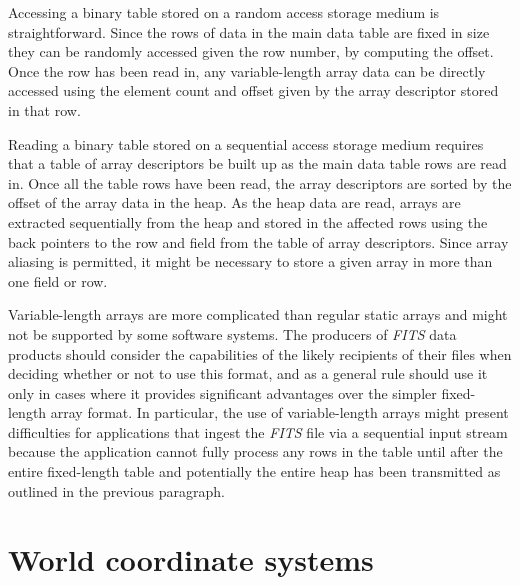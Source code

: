 \documentclass[onecolumn]{aa}
\begin{document}
Accessing a binary table stored on a random access storage medium is
straightforward.  Since the rows of data in the main data table are fixed
in size they can be randomly accessed given the row number, by
computing the offset.  Once the row has been read in, any variable-length
array data can be directly accessed using the element count and
offset given by the array descriptor stored in that row.

Reading a binary table stored on a sequential access storage medium
requires that a table of array descriptors be built
up as the main data
table rows are read in.  Once all the table rows have been read,
the array descriptors are sorted by the offset of the array data in
the heap.  As the heap data are read, 
arrays are extracted sequentially
from the heap and stored in the affected rows using the back
pointers to the row and field from the table of array descriptors.
Since array aliasing is permitted, it might be necessary to store a
given array in more than one field or row.

Variable-length arrays are more complicated
than regular static arrays and
might not be supported by some software systems.  The producers of
{\em FITS\/} data products should consider the capabilities 
of the likely recipients of their files when deciding whether or
not to use this format, and as a general rule should use it only
in cases where it provides significant advantages over the simpler
fixed-length array format.  In particular, the use of variable-length
arrays might present difficulties for applications that ingest the
{\em FITS\/} file via a sequential input stream because the application 
cannot fully process any rows in the table until after the entire fixed-length
table and potentially the entire heap has been transmitted as outlined
in the previous paragraph.

\section{World coordinate systems}
\label{s:WCS}
\end{document}
